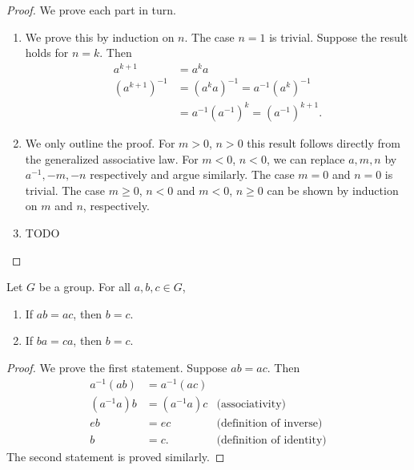 \begin{proof}
    We prove each part in turn.
    \begin{enumerate}[label=(\alph*), wide]
        \item We prove this by induction on \(n\). The case \(n = 1\) is
        trivial. Suppose the result holds for \(n = k\). Then
        \begin{align*}
            a^{k + 1} & = a^k a\\
            (a^{k + 1})^{-1} & = (a^k a)^{-1} = a^{-1} (a^k)^{-1}\\
            & = a^{-1} (a^{-1})^k = (a^{-1})^{k + 1}.
        \end{align*}
        \item We only outline the proof. For \(m > 0\), \(n > 0\) this result
        follows directly from the generalized associative law. For \(m < 0\),
        \(n < 0\), we can replace \(a, m, n\) by \(a^{-1}, -m, -n\) respectively
        and argue similarly. The case \(m = 0\) and \(n = 0\) is trivial. The
        case \(m \geq 0\), \(n < 0\) and \(m < 0\), \(n \geq 0\) can be shown by
        induction on \(m\) and \(n\), respectively.
        
        \item TODO

    \end{enumerate}
\end{proof}

\begin{theorem}
    Let \(G\) be a group. For all \(a, b, c \in G\),
    \begin{enumerate}
        \item If \(ab = ac\), then \(b = c\).
        \item If \(ba = ca\), then \(b = c\).
    \end{enumerate}
\end{theorem}

\begin{proof}
    We prove the first statement. Suppose \(ab = ac\). Then
    \begin{align*}
        a^{-1}(ab) &= a^{-1}(ac) &\\
        (a^{-1}a)b &= (a^{-1}a)c &\text{(associativity)}\\
        eb &= ec &\text{(definition of inverse)}\\
        b &= c. &\text{(definition of identity)}
    \end{align*}
    The second statement is proved similarly.
\end{proof}

